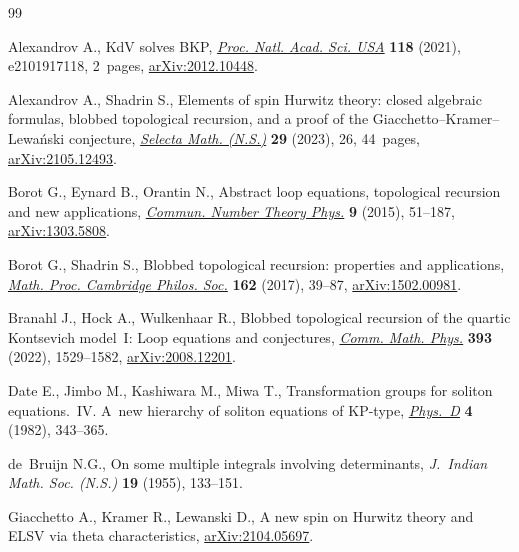 \begin{thebibliography}{99}
\footnotesize\itemsep=0pt

Alexandrov A., Kd{V} solves {BKP}, \href{https://doi.org/10.1073/pnas.2101917118}{\textit{Proc. Natl. Acad. Sci. USA}}
 \textbf{118} (2021), e2101917118, 2~pages, \href{https://arxiv.org/abs/2012.10448}{arXiv:2012.10448}.

Alexandrov A., Shadrin S., Elements of spin {H}urwitz theory: closed algebraic
 formulas, blobbed topological recursion, and a proof of the
 {G}iacchetto--{K}ramer--{L}ewa\'nski conjecture, \href{https://doi.org/10.1007/s00029-023-00834-1}{\textit{Selecta Math.
 (N.S.)}} \textbf{29} (2023), 26, 44~pages, \href{https://arxiv.org/abs/2105.12493}{arXiv:2105.12493}.

Borot G., Eynard B., Orantin N., Abstract loop equations, topological recursion
 and new applications, \href{https://doi.org/10.4310/CNTP.2015.v9.n1.a2}{\textit{Commun. Number Theory Phys.}} \textbf{9} (2015),
 51--187, \href{https://arxiv.org/abs/1303.5808}{arXiv:1303.5808}.

Borot G., Shadrin S., Blobbed topological recursion: properties and
 applications, \href{https://doi.org/10.1017/S0305004116000323}{\textit{Math. Proc. Cambridge Philos. Soc.}} \textbf{162}
 (2017), 39--87, \href{https://arxiv.org/abs/1502.00981}{arXiv:1502.00981}.

Branahl J., Hock A., Wulkenhaar R., Blobbed topological recursion of the
 quartic {K}ontsevich model~{I}: {L}oop equations and conjectures,
 \href{https://doi.org/10.1007/s00220-022-04392-z}{\textit{Comm. Math. Phys.}} \textbf{393} (2022), 1529--1582,
 \href{https://arxiv.org/abs/2008.12201}{arXiv:2008.12201}.

Date E., Jimbo M., Kashiwara M., Miwa T., Transformation groups for soliton
 equations.~{IV}. {A}~new hierarchy of soliton equations of {KP}-type,
 \href{https://doi.org/10.1016/0167-2789(82)90041-0}{\textit{Phys.~D}} \textbf{4} (1982), 343--365.

de~Bruijn N.G., On some multiple integrals involving determinants,
 \textit{J.~Indian Math. Soc. (N.S.)} \textbf{19} (1955), 133--151.

Giacchetto A., Kramer R., Lewanski D., A new spin on {H}urwitz theory and
 {ELSV} via theta characteristics, \href{https://arxiv.org/abs/2104.05697}{arXiv:2104.05697}.


\end{thebibliography}

